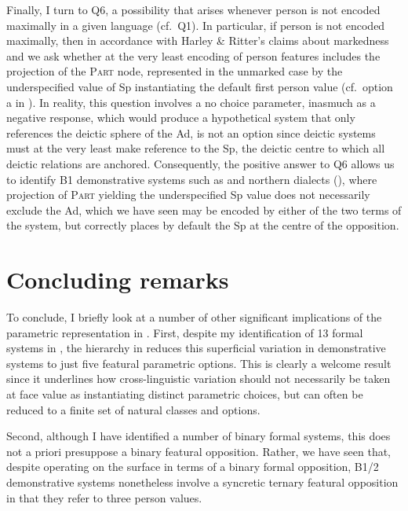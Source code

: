 \documentclass[output=paper]{langsci/langscibook}
\begin{document}
Finally, I turn to Q6, a possibility that arises whenever person is not encoded
maximally in a given language (cf.\ Q1). In particular, if person is not encoded
maximally, then in accordance with Harley \& Ritter’s claims about markedness
and  we ask whether at the very least encoding of person
features includes the projection of the \textsc{Part} node, represented in the
unmarked case by the underspecified value of Sp instantiating the default first
person value (cf.\ option a in ). In reality, this question
involves a no choice parameter, inasmuch as a negative response, which would
produce a hypothetical system that only references the deictic sphere of the
Ad, is not an option since deictic systems must at the very least make
reference to the Sp, the deictic centre to which all deictic relations are
anchored. Consequently, the positive answer to Q6 allows us to identify
B1 demonstrative systems such as  and northern 
dialects (), where projection of
\textsc{Part} yielding the underspecified Sp value does not necessarily exclude
the Ad, which we have seen may be encoded by either of the two terms of the
system, but correctly places by default the Sp at the centre of the opposition.

\section{Concluding remarks}

To conclude, I briefly look at a number of other significant implications of
the parametric representation in . First, despite my
identification of 13 formal systems in , the hierarchy in
 reduces this superficial variation in demonstrative systems
to just five featural parametric options. This is clearly a welcome result
since it underlines how cross-linguistic variation should not necessarily be
taken at face value as instantiating distinct parametric choices, but can often
be reduced to a finite set of natural classes and options.

Second, although I have identified a number of binary formal systems, this does
not a priori presuppose a binary featural opposition. Rather, we have
seen that, despite operating on the surface in terms of a binary formal
opposition, B1/2 demonstrative systems nonetheless involve a
syncretic ternary featural opposition in that they refer to three person
values.
\end{document}
